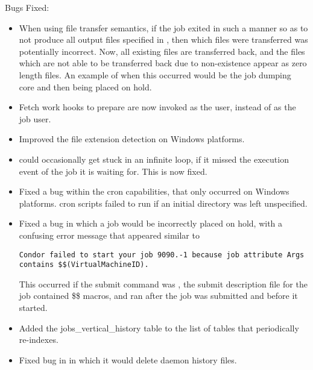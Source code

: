 \noindent Bugs Fixed:

\begin{itemize}

\item
When using file transfer semantics,
if the job exited in such a manner so as to not produce all
output files specified in ,
then which files were transferred was potentially incorrect.
Now, all existing files are transferred back,
and the files which are not able to be transferred back due to non-existence
appear as zero length files.
An example of when this occurred would be the job dumping core
and then being placed on hold.

\item
Fetch work hooks to prepare are now invoked as the  user,
instead of as the job user.

\item
Improved the file extension detection on Windows platforms.

\item
{} could occasionally get stuck in an infinite loop,
if it missed the execution event of the job it is waiting for.
This is now fixed.

\item
Fixed a bug within the  cron capabilities,
that only occurred on Windows platforms.
 cron scripts failed to run if an initial directory was left
unspecified.

\item
Fixed a bug in which a job would be incorrectly placed on hold, with 
a confusing error message that appeared similar to
\footnotesize
\begin{verbatim}
Condor failed to start your job 9090.-1 because job attribute Args contains $$(VirtualMachineID).
\end{verbatim}
\normalsize
This occurred if the submit command  
was ,
the submit description file for the job contained \$\$ macros,
and  ran after the job was submitted and before it started.

\item
Added the jobs\_vertical\_history table to the list of tables that
 periodically re-indexes.

\item
Fixed bug in  in which it would delete  daemon
history files.


\end{itemize}
